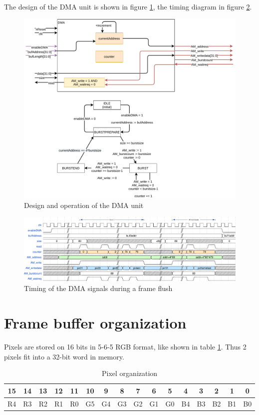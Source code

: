 \documentclass[12pt,a4paper]{article}
\begin{document}
The design of the DMA unit is shown in figure \ref{fig:dma}, the timing diagram in figure \ref{fig:dmatime}.

\begin{figure}[h]
	\centering
	\includegraphics[width=.85\textwidth]{figures/dma}
	\caption{Design and operation of the DMA unit}
	\label{fig:dma}
\end{figure}

\begin{figure}[ht!]
	\centering
	\includegraphics[width=\textwidth]{figures/dma_timings}
	\caption{Timing of the DMA signals during a frame flush}
	\label{fig:dmatime}
\end{figure}


\section{Frame buffer organization}

Pixels are stored on 16 bits in 5-6-5 RGB format, like shown in table \ref{tab:pixel}. Thus 2 pixels fit into a 32-bit word in memory.

\begin{table}[h]
	\centering
	\begin{tabular}{|c|c|c|c|c||c|c|c|c|c|c||c|c|c|c|c|}
		\hline
		15 & 14 & 13 & 12 & 11 & 10 & 9 & 8 & 7 & 6 & 5 & 4 & 3 & 2 & 1 & 0 \\
		\hline
		R4 & R3 & R2 & R1 & R0 & G5 & G4 & G3 & G2 & G1 & G0 & B4 & B3 & B2 & B1 & B0 \\
		\hline	
	\end{tabular}
	\caption{Pixel organization}
	\label{tab:pixel}
\end{table}
\end{document}
